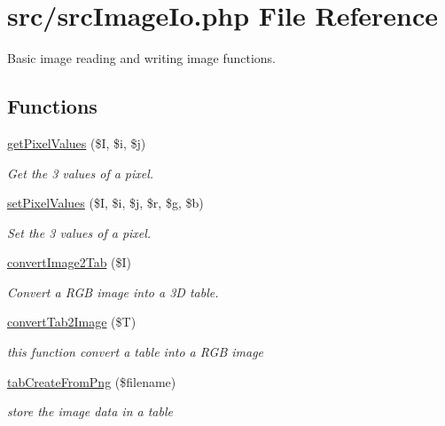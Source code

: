 \hypertarget{src_image_io_8php}{
\section{src/src\-Image\-Io.php \-File \-Reference}
\label{src_image_io_8php}
}


\-Basic image reading and writing image functions.  


\subsection*{\-Functions}
\begin{DoxyCompactItemize}
\item 
\hyperlink{src_image_io_8php_ab73076b368326e499ce3107206882e4d}{get\-Pixel\-Values} (\$\-I, \$i, \$j)
\begin{DoxyCompactList}\small\item\em \-Get the 3 values of a pixel. \end{DoxyCompactList}\item 
\hyperlink{src_image_io_8php_a0570e456a725214ce051800c3eb2cc83}{set\-Pixel\-Values} (\$\-I, \$i, \$j, \$r, \$g, \$b)
\begin{DoxyCompactList}\small\item\em \-Set the 3 values of a pixel. \end{DoxyCompactList}\item 
\hyperlink{src_image_io_8php_a071952c3f25b07f2880b97a13499ff3f}{convert\-Image2\-Tab} (\$\-I)
\begin{DoxyCompactList}\small\item\em \-Convert a \-R\-G\-B image into a 3\-D table. \end{DoxyCompactList}\item 
\hyperlink{src_image_io_8php_ad7e03bf22c9c744da53c9c5fc468e6f0}{convert\-Tab2\-Image} (\$\-T)
\begin{DoxyCompactList}\small\item\em this function convert a table into a \-R\-G\-B image \end{DoxyCompactList}\item 
\hyperlink{src_image_io_8php_ab284b36339e9c39321efdd780d1052b4}{tab\-Create\-From\-Png} (\$filename)
\begin{DoxyCompactList}\small\item\em store the image data in a table \end{DoxyCompactList}\item 

\end{DoxyCompactItemize}
